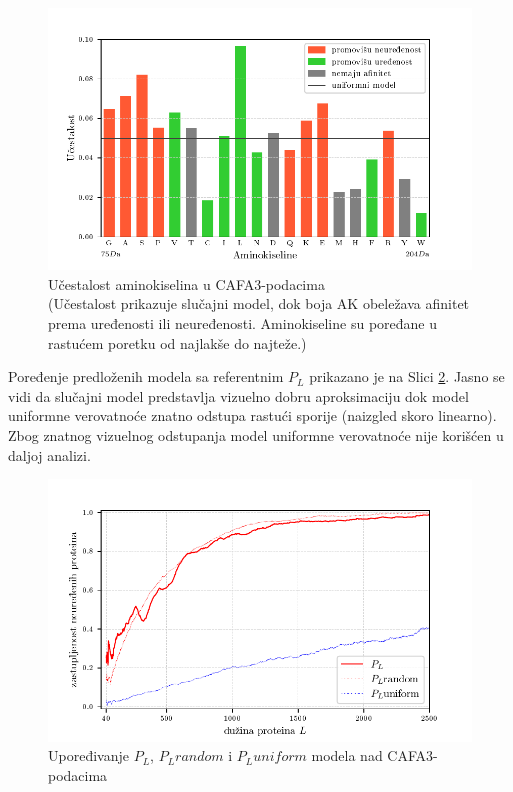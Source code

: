 \begin{figure}[th]
\centering
\includegraphics[]{plots/AK_ucestalost}
\caption{
  Učestalost aminokiselina u CAFA3-podacima
  \\ \footnotesize
  (Učestalost prikazuje slučajni model, dok boja AK obeležava afinitet prema
  uređenosti ili neuređenosti. Aminokiseline su poređane u rastućem poretku
  od najlakše do najteže.) 
}
\label{fig:AK_ucestalost}
\end{figure}

Poređenje predloženih modela sa referentnim $P_L$ prikazano je na Slici
\ref{fig:PL2}. Jasno se vidi da slučajni model predstavlja vizuelno dobru
aproksimaciju dok model uniformne verovatnoće znatno odstupa rastući sporije (naizgled
skoro linearno).
Zbog znatnog vizuelnog odstupanja model uniformne verovatnoće nije korišćen u daljoj analizi.


\begin{figure}[th]
\centering
\includegraphics[]{plots/PL_F_cmp}
\caption{Upoređivanje $P_L$, $P_L random$ i $P_L uniform$ modela nad CAFA3-podacima}
\label{fig:PL2}
\end{figure}


